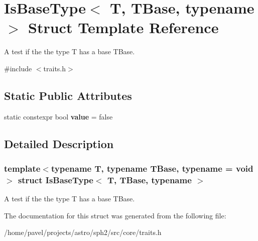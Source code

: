 \hypertarget{structIsBaseType}{}\section{Is\+Base\+Type$<$ T, T\+Base, typename $>$ Struct Template Reference}
\label{structIsBaseType}


A test if the the type T has a base T\+Base.  




{\ttfamily \#include $<$traits.\+h$>$}

\subsection*{Static Public Attributes}
\begin{DoxyCompactItemize}
\item 
\hypertarget{structIsBaseType_aafb26a2b86a7f915f874fd64476e026a}{}\label{structIsBaseType_aafb26a2b86a7f915f874fd64476e026a} 
static constexpr bool {\bfseries value} = false
\end{DoxyCompactItemize}


\subsection{Detailed Description}
\subsubsection*{template$<$typename T, typename T\+Base, typename = void$>$\newline
struct Is\+Base\+Type$<$ T, T\+Base, typename $>$}

A test if the the type T has a base T\+Base. 

The documentation for this struct was generated from the following file\+:\begin{DoxyCompactItemize}
\item 
/home/pavel/projects/astro/sph2/src/core/traits.\+h\end{DoxyCompactItemize}
